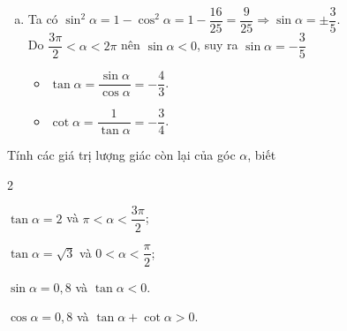 \begin{vd}
{\begin{enumerate}[a)]
			\item Ta có $\sin^2 \alpha=1-\cos^2\alpha = 1-\dfrac{16}{25}=\dfrac{9}{25} \Rightarrow \sin \alpha = \pm \dfrac{3}{5}$.\\
			Do $\dfrac{3\pi}{2} <\alpha <2\pi$ nên $\sin \alpha <0$, suy ra $\sin \alpha = -\dfrac{3}{5}$
			\begin{itemize}
				\item  $\tan \alpha = \dfrac{\sin \alpha}{\cos \alpha}=-\dfrac{4}{3}$.
				\item  $\cot \alpha = \dfrac{1}{\tan \alpha}=-\dfrac{3}{4}$.
			\end{itemize} 
			
	\end{enumerate}}
\end{vd} 

\begin{vd}
	Tính các giá trị lượng giác còn lại của góc $\alpha$, biết
	\begin{enumEX}{2}
		\item $\tan \alpha =2$ và $\pi <\alpha <\dfrac{3\pi}{2}$;
		\item $\tan \alpha =\sqrt{3}$ và $0<\alpha <\dfrac{\pi}{2} $;
		\item $\sin \alpha =0{,}8$ và $\tan \alpha <0$.
		\item $\cos \alpha =0{,}8$ và $\tan \alpha +\cot \alpha >0$.
	\end{enumEX}
\end{vd}
